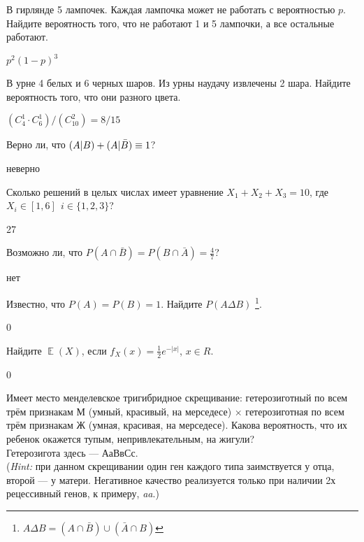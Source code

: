 \documentclass[12pt, addpoints, answers]{exam} %
\DeclareMathOperator{\E}{\mathbb{E}}
\let\P\relax
\DeclareMathOperator{\P}{\mathbb{P}}
\begin{document}
\begin{questions}
\question В гирлянде 5 лампочек. Каждая лампочка может не работать с вероятностью $p$. Найдите вероятность того, что не работают 1 и 5 лампочки, а все остальные работают.
\begin{solution}
 $p^{2}(1-p)^{3}$
\end{solution}


\question В урне 4 белых и 6 черных шаров. Из урны наудачу извлечены 2 шара. Найдите вероятность того, что они разного цвета.
\begin{solution}
 $(C_{4}^1 \cdot C_{6}^1)/ (C_{10}^2) = 8/15$
\end{solution}

\question Верно ли, что $\P(A|B) + \P(A|\bar{B}) \equiv 1$?
\begin{solution}
 неверно
\end{solution}

\question Сколько решений в целых числах имеет  уравнение $X_1 + X_2 + X_3 = 10$, где  $X_i \in [1,6] \: \: i \in \{1,2,3\}$?
\begin{solution}
 27
\end{solution}

\question  Возможно ли, что $P(A \cap \bar{B}) = P(B \cap \bar{A}) = \frac{4}{7}$?

\begin{solution}
 нет
\end{solution}

\question  Известно, что $P(A) = P(B) = 1$. Найдите $P(A\Delta B)$
\footnote{$A\Delta B = (A \cap \bar B) \cup ( \bar A \cap B)$}.

\begin{solution}
 0
\end{solution}

\question Найдите $\E(X)$, если $f_X(x) = \frac{1}{2}e^{-|x|}$, $x \in R$.

\begin{solution}
 0
\end{solution}

\question  Имеет место менделевское тригибридное скрещивание: гетерозиготный по всем трём признакам М (умный, красивый, на мерседесе) $\times$ гетерозиготная по всем трём признакам Ж (умная, красивая, на мерседесе). Какова вероятность, что их ребенок окажется тупым, непривлекательным, на жигули?\\
Гетерозигота здесь --- АаВвСс.\\
({\it Hint:} при данном скрещивании один ген каждого типа заимствуется у отца, второй --- у матери. Негативное качество реализуется только при наличии 2х рецессивный генов, к примеру, {\it aa}.)


\end{questions}
\end{document}
